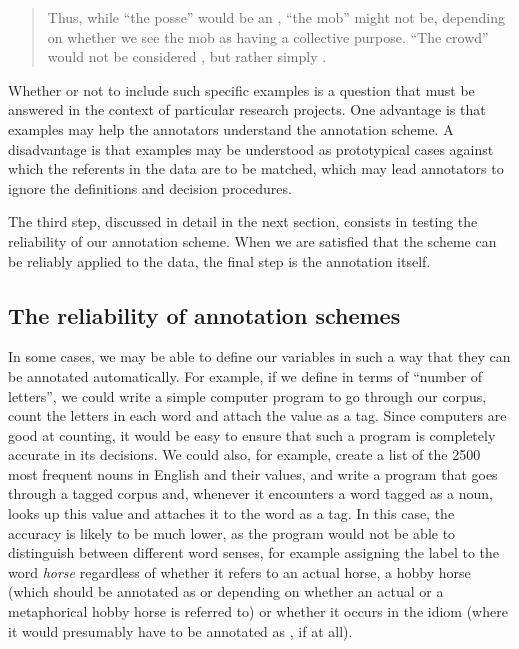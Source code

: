 \begin{quote}
Thus, while ``the posse'' would be an , ``the mob'' might not be, depending on whether we see the mob as having a collective purpose. ``The crowd'' would not be considered , but rather simply  .
\end{quote}

Whether or not to include such specific examples is a question that must be answered in the context of particular research projects. One advantage is that examples may help the annotators  understand the annotation scheme. A disadvantage is that examples may be understood as prototypical cases against which the referents in the data are to be matched, which may lead annotators  to ignore the definitions and decision procedures.

The third step, discussed in detail in the next section, consists in testing the reliability  of our annotation scheme. When we are satisfied that the scheme can be reliably applied to the data, the final step is the annotation  itself.

\subsection{The reliability of annotation schemes}
\label{sec:reliabilityannotationschemes}

In some cases, we may be able to define our variables in such a way that they can be annotated  automatically. For example, if we define   in terms of ``number of letters'', we could write a simple computer program to go through our corpus, count the letters in each word and attach the value as a tag. Since computers are good at counting, it would be easy to ensure that such a program is completely accurate in its decisions. We could also, for example, create a list of the 2500 most frequent nouns  in English and their   values, and write a program that goes through a tagged  corpus and, whenever it encounters a word tagged as a noun, looks up this value and attaches it to the word as a tag. In this case, the accuracy is likely to be much lower, as the program would not be able to distinguish between different word senses, for example assigning the label   to the word \textit{horse} regardless of whether it refers to an actual horse, a hobby horse (which should be annotated  as  or  depending on whether an actual or a metaphorical hobby horse is referred to) or whether it occurs in the idiom   (where it would presumably have to be annotated as , if at all).

